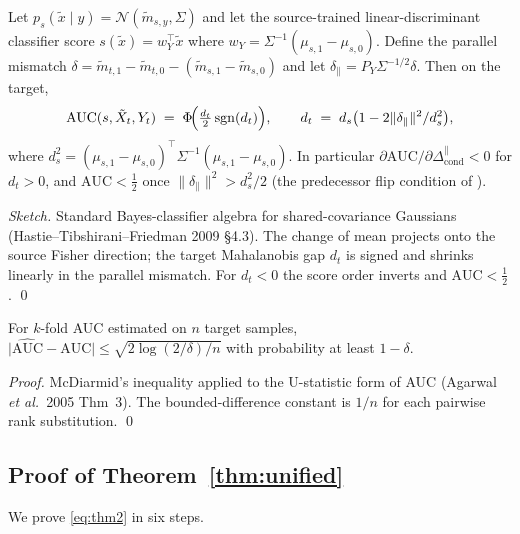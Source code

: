 \begin{lemma}
\label{lem:auc}
Let $p_s(\tilde x\mid y)=\mathcal{N}(\tilde m_{s,y},\Sigma)$ and let
the source-trained linear-discriminant classifier score $s(\tilde x)
= w_Y^{\top}\tilde x$ where $w_Y=\Sigma^{-1}(\mu_{s,1}-\mu_{s,0})$.
Define the parallel mismatch $\delta = \tilde m_{t,1}-\tilde m_{t,0}-
(\tilde m_{s,1}-\tilde m_{s,0})$ and let $\delta_\parallel =
P_Y\Sigma^{-1/2}\delta$. Then on the target,
\[
  \mathrm{AUC}(s,\tilde X_t,Y_t)
  \;=\; \Phi\!\Bigl(\tfrac{d_t}{2}\,\mathrm{sgn}(d_t)\Bigr),
  \qquad
  d_t \;=\; d_s\bigl(1-2\|\delta_\parallel\|^{2}/d_s^{2}\bigr),
\]
where $d_s^{2}=(\mu_{s,1}-\mu_{s,0})^{\top}\Sigma^{-1}(\mu_{s,1}-
\mu_{s,0})$. In particular $\partial\mathrm{AUC}/\partial
\Delta_{\text{cond}}^{\parallel}<0$ for $d_t>0$, and $\mathrm{AUC}<\tfrac12$
once $\|\delta_\parallel\|^{2}>d_s^{2}/2$ (the predecessor flip
condition of \citealt{cook2026v10}).
\end{lemma}

\begin{proof}[Sketch]
Standard Bayes-classifier algebra for shared-covariance Gaussians
(Hastie--Tibshirani--Friedman 2009 §4.3). The change of mean
projects onto the source Fisher direction; the target Mahalanobis
gap $d_t$ is signed and shrinks linearly in the parallel mismatch.
For $d_t<0$ the score order inverts and $\mathrm{AUC}<\tfrac12$. \qed
\end{proof}

\begin{lemma}[CV concentration]
\label{lem:mcdiarmid}
For $k$-fold AUC estimated on $n$ target samples,
$\bigl|\widehat{\mathrm{AUC}}-\mathrm{AUC}\bigr|\le
\sqrt{2\log(2/\delta)/n}$ with probability at least $1-\delta$.
\end{lemma}

\begin{proof}
McDiarmid's inequality applied to the U-statistic form of AUC
(Agarwal \emph{et al.}\ 2005 Thm~3). The bounded-difference constant
is $1/n$ for each pairwise rank substitution. \qed
\end{proof}

\subsection{Proof of Theorem~\ref{thm:unified}}

We prove \eqref{eq:thm2} in six steps.

